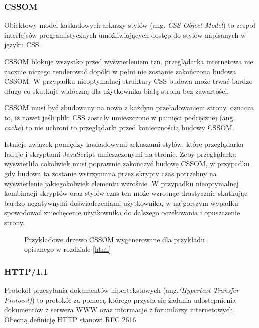 \documentclass[polish, twoside, 12pt]{mwart}
\begin{document}
\subsubsection{CSSOM} \label{cssom}

Obiektowy model kaskadowych arkuszy stylów (ang. \emph{CSS Object Model}) to zespoł interfejsów programistycznych umożliwiających dostęp do stylów napisanych w języku CSS.

CSSOM blokuje wszystko przed wyświetleniem tzn. przeglądarka internetowa nie zacznie niczego renderować dopóki w pełni nie zostanie zakończona budowa CSSOM. W przypadku nieoptymalnej struktury CSS budowa może trwać bardzo długo co skutkuje widoczną dla użytkownika białą stroną bez zawartości.

CSSOM musi być zbudowany na nowo z każdym przeładowaniem strony, oznacza to, iż nawet jeśli pliki CSS zostały umieszczone w pamięci podręcznej (ang. \emph{cache}) to nie uchroni to przeglądarki przed koniecznością budowy CSSOM.

Istnieje związek pomiędzy kaskadowymi arkuszami stylów, które przeglądarka ładuje i skryptami JavaScript umieszczonymi na stronie. Żeby przeglądarka wyświetliła cokolwiek musi poprawnie zakończyć budowę CSSOM, w przypadku gdy budowa ta zostanie wstrzymana przez skrypty czas potrzebny na wyświetlenie jakiegokolwiek elementu wzrośnie. W przypadku nieoptymalnej kombinacji skryptów oraz stylów czas ten może wzrosnąc drastycznie skutkując bardzo negatywnymi doświadczeniami użytkownika, w najgorszym wypadku spowodować zniechęcenie użytkownika do dalszego oczekiwania i opuszczenie strony.

\begin{figure}
  \centering
  \caption{Przykładowe drzewo CSSOM wygenerowane dla przykładu opisanego w rozdziale \ref{html}}
\end{figure}
\subsubsection{HTTP/1.1} \label{http/1.1}

Protokół przesyłania dokumentów hipertekstowych (ang.\emph{(Hypertext Transfer Protocol)}) to protokół za pomocą którego przysła się żadania udostępnienia dokumentów z serwera WWW oraz informacje z forumlarzy internetowych. Obecną definicję HTTP stanowi RFC 2616 \cite{rfc2616}
\end{document}
